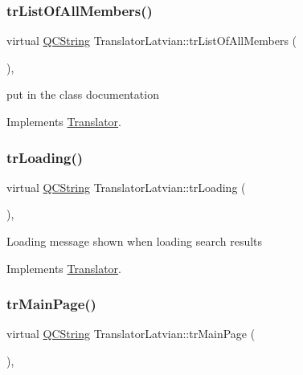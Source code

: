 \subsubsection{\texorpdfstring{trListOfAllMembers()}{trListOfAllMembers()}}
{\footnotesize\ttfamily virtual \mbox{\hyperlink{class_q_c_string}{Q\+C\+String}} Translator\+Latvian\+::tr\+List\+Of\+All\+Members (\begin{DoxyParamCaption}{ }\end{DoxyParamCaption})\hspace{0.3cm}{\ttfamily [inline]}, {\ttfamily [virtual]}}

put in the class documentation 

Implements \mbox{\hyperlink{class_translator}{Translator}}.

\mbox{\label{class_translator_latvian_ae3a60ea9102c987a4409193f10d9b10d}} 
\subsubsection{\texorpdfstring{trLoading()}{trLoading()}}
{\footnotesize\ttfamily virtual \mbox{\hyperlink{class_q_c_string}{Q\+C\+String}} Translator\+Latvian\+::tr\+Loading (\begin{DoxyParamCaption}{ }\end{DoxyParamCaption})\hspace{0.3cm}{\ttfamily [inline]}, {\ttfamily [virtual]}}

Loading message shown when loading search results 

Implements \mbox{\hyperlink{class_translator}{Translator}}.

\mbox{\label{class_translator_latvian_a4912ddc972266330e41d3a1eeffa8e1d}} 
\subsubsection{\texorpdfstring{trMainPage()}{trMainPage()}}
{\footnotesize\ttfamily virtual \mbox{\hyperlink{class_q_c_string}{Q\+C\+String}} Translator\+Latvian\+::tr\+Main\+Page (\begin{DoxyParamCaption}{ }\end{DoxyParamCaption})\hspace{0.3cm}{\ttfamily [inline]}, {\ttfamily [virtual]}}

